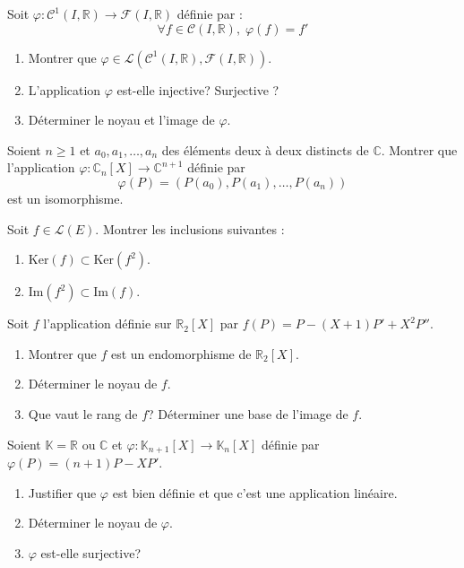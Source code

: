 \documentclass[a4paper,twoside,french,10pt]{VcCours}
\begin{document}
\medskip

Soit $\varphi : \mathcal{C}^1(I, \mathbb{R}) \rightarrow \mathcal{F}(I, \mathbb{R})$ définie par :
$$ \forall f \in \mathcal{C}(I, \mathbb{R}), \; \varphi(f)=f'$$

\begin{enumerate}
\item Montrer que $\varphi \in \mathcal{L}(\mathcal{C}^1(I, \mathbb{R}),\mathcal{F}(I, \mathbb{R}))$.
\item L'application $\varphi$ est-elle injective? Surjective ?
\item Déterminer le noyau et l'image de $\varphi$.
\end{enumerate}

\medskip

\begin{Exercice}{}\end{Exercice} Soient $n \geq 1$ et $a_{0} ,a_{1} , \ldots ,a_{n}$ des éléments deux à deux distincts de $\mathbb{C}$. Montrer que l'application $\varphi \colon \mathbb{C}_n[X] \rightarrow \mathbb{C}^{n+1}$ définie par
  \[
  \varphi(P) = (P(a_{0}),P(a_{1}), \ldots ,P(a_{n}))
  \]
  est un isomorphisme.
  
  \medskip


\begin{Exercice}{}\end{Exercice} Soit $f \in \mathcal{L}(E)$. Montrer les inclusions suivantes :

\begin{enumerate}
\item $\textrm{Ker}(f) \subset \textrm{Ker}(f^2)$.
\item $\textrm{Im}(f^2) \subset \textrm{Im}(f)$.
\end{enumerate}

\newpage

\begin{Exercice}{}\end{Exercice} Soit $f$ l'application définie sur $\mathbb{R}_2[X]$ par $f(P)=P-(X+1)P'+X^2 P''$.
\begin{enumerate}
\item Montrer que $f$ est un endomorphisme de $\mathbb{R}_2[X]$.
\item Déterminer le noyau de $f$.
\item Que vaut le rang de $f$? Déterminer une base de l'image de $f$.
\end{enumerate}

\medskip

\begin{Exercice}{}\end{Exercice} Soient $\mathbb{K}= \mathbb{R}$ ou $\mathbb{C}$ et $\varphi : \mathbb{K}_{n+1}[X]\rightarrow \mathbb{K}_{n}[X]$ définie par $\varphi(P) = (n + 1)P - XP'$.
    \begin{enumerate}
      \item
        Justifier que $\varphi$ est bien définie et que c'est une application linéaire.
      \item
        Déterminer le noyau de $\varphi$.
      \item
        $\varphi$ est-elle surjective?
    \end{enumerate}
    
\end{document}
